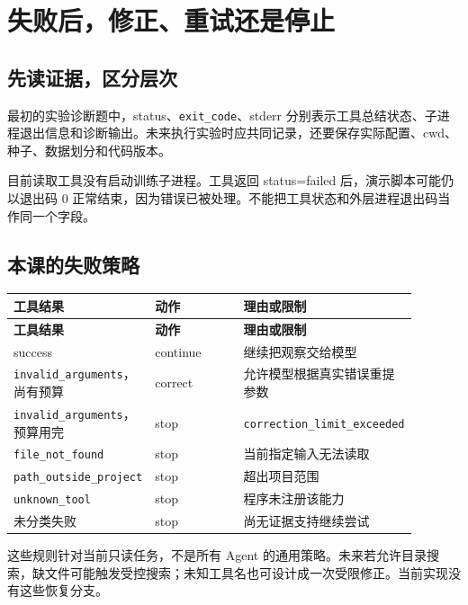 \section{失败后，修正、重试还是停止}

\subsection{先读证据，区分层次}

最初的实验诊断题中，status、\nolinkurl{exit_code}、stderr 分别表示工具总结状态、子进程退出信息和诊断输出。未来执行实验时应共同记录，还要保存实际配置、cwd、种子、数据划分和代码版本。

目前读取工具没有启动训练子进程。工具返回 status=failed 后，演示脚本可能仍以退出码 0 正常结束，因为错误已被处理。不能把工具状态和外层进程退出码当作同一个字段。

\subsection{本课的失败策略}

{\small\setlength{\tabcolsep}{4pt}
\renewcommand{\arraystretch}{1.25}
\begin{longtable}{>{\raggedright\arraybackslash}p{0.23\linewidth}>{\raggedright\arraybackslash}p{0.33\linewidth}>{\raggedright\arraybackslash}p{0.33\linewidth}}
\toprule
\textbf{工具结果} & \textbf{动作} & \textbf{理由或限制} \\
\midrule\endfirsthead
\toprule
\textbf{工具结果} & \textbf{动作} & \textbf{理由或限制} \\
\midrule\endhead
\bottomrule\endfoot
success & continue & 继续把观察交给模型 \\
\nolinkurl{invalid_arguments}，尚有预算 & correct & 允许模型根据真实错误重提参数 \\
\nolinkurl{invalid_arguments}，预算用完 & stop & \nolinkurl{correction_limit_exceeded} \\
\nolinkurl{file_not_found} & stop & 当前指定输入无法读取 \\
\nolinkurl{path_outside_project} & stop & 超出项目范围 \\
\nolinkurl{unknown_tool} & stop & 程序未注册该能力 \\
未分类失败 & stop & 尚无证据支持继续尝试 \\
\end{longtable}}

这些规则针对当前只读任务，不是所有 Agent 的通用策略。未来若允许目录搜索，缺文件可能触发受控搜索；未知工具名也可设计成一次受限修正。当前实现没有这些恢复分支。

